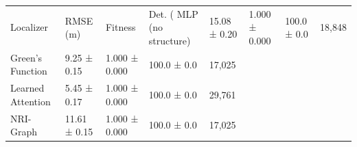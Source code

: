 \begin{tabular}{lllll}
\toprule
Localizer & RMSE (m) & Fitness & Det. (%
\midrule
MLP (no structure) & 15.08 ± 0.20 & 1.000 ± 0.000 & 100.0 ± 0.0 & 18,848 \\
Green's Function & 9.25 ± 0.15 & 1.000 ± 0.000 & 100.0 ± 0.0 & 17,025 \\
Learned Attention & 5.45 ± 0.17 & 1.000 ± 0.000 & 100.0 ± 0.0 & 29,761 \\
NRI-Graph & 11.61 ± 0.15 & 1.000 ± 0.000 & 100.0 ± 0.0 & 17,025 \\
\bottomrule
\end{tabular}

